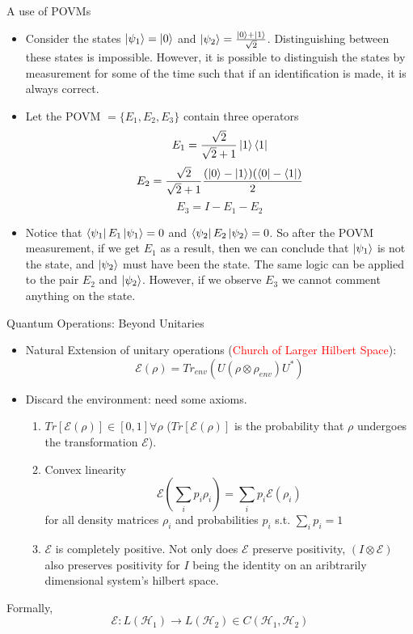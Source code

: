 \documentclass[handout]{beamer}
\newcommand{\Hilb}{\mathcal{H}}
\newcommand{\E}{\mathcal{E}}
\begin{document}
\begin{frame}{A use of POVMs}
\begin{itemize}
    \item Consider the states $\ket{\psi_1}=\ket{0}$ and $\ket{\psi_2}=\frac{\ket{0}+\ket{1}}{\sqrt{2}}$. Distinguishing between these states is impossible. However, it is possible to distinguish the states by measurement for some of the time such that if an identification is made, it is always correct.
\pause
    \item Let the POVM $= \{{E_1}, {E_2}, {E_3}\}$ contain three operators \[E_1 = \frac{\sqrt{2}}{\sqrt{2} + 1} \ket{1} \bra{1} \] \[ E_2 = \frac{\sqrt{2}}{\sqrt{2} + 1} \frac{(\ket{0} - \ket{1})(\bra{0} - \bra{1})}{2}\] \[E_3=  I - E_1 - E_2\]
    \item Notice that $\bra{\psi_1} E_1\ket{\psi_1}=0$ and $\bra{\psi_2} E_2\ket{\psi_2}=0$. So after the POVM measurement, if we get $E_1$ as a result, then we can conclude that $\ket{\psi_1}$ is not the state, and $\ket{\psi_2}$ must have been the state. The same logic can be applied to the pair $E_2$ and $\ket{\psi_2}$. However, if we observe $E_3$ we cannot comment anything on the state. 
\end{itemize}
\end{frame}

\begin{frame}{Quantum Operations: Beyond Unitaries}
    \begin{itemize}
        \item Natural Extension of unitary operations (\textcolor{red}{Church of Larger Hilbert Space}): 
             \[\E(\rho) = Tr_{env}(U(\rho\otimes\rho_{env})U^*) \]
        \item Discard the environment: need some axioms.\pause
        \begin{enumerate}
            \item $Tr[\E(\rho)] \in [0,1] \forall \rho$ ($Tr[\E(\rho)]$ is the probability that $\rho$ undergoes the transformation $\E$).\pause
            \item Convex linearity
            \[\E(\sum_ip_i\rho_i) = \sum_ip_i\E(\rho_i)\]
            for all density matrices $\rho_i$ and probabilities $p_i$ s.t. $\sum_ip_i = 1$
            \item $\E$ is completely positive. Not only does $\E$ preserve positivity, $(I\otimes\E)$ also preserves positivity for $I$ being the identity on an aribtrarily dimensional system's hilbert space.\pause
        \end{enumerate}
    \end{itemize}
Formally, 
\[\E: L(\Hilb_1) \to L(\Hilb_2) \in C(\Hilb_1,\Hilb_2)\]
\end{frame}
\end{document}
